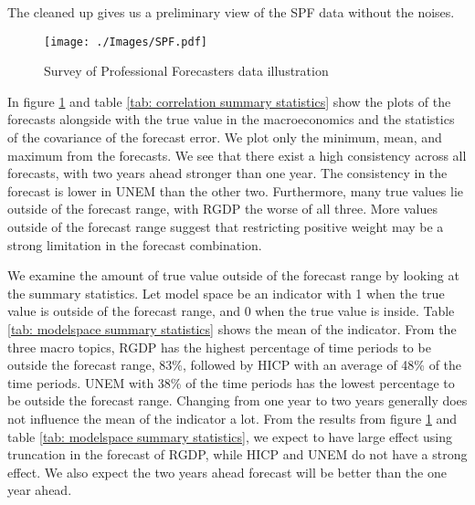 \documentclass[11pt]{article}
\begin{document}
The cleaned up gives us a preliminary view of the SPF data without the noises.

\begin{figure}[!h]
	\centering
	\texttt{[image: ./Images/SPF.pdf]}
	\caption{Survey of Professional Forecasters data illustration}\label{fig: SPF data illustration}
\end{figure}

In figure \ref{fig: SPF data illustration} and table \ref{tab: correlation summary statistics} show the plots of the forecasts alongside with the true value in the macroeconomics and the statistics of the covariance of the forecast error. We plot only the minimum, mean, and maximum from the forecasts. We see that there exist a high consistency across all forecasts, with two years ahead stronger than one year. The consistency in the forecast is lower in UNEM than the other two. Furthermore, many true values lie outside of the forecast range, with RGDP the worse of all three. More values outside of the forecast range suggest that restricting positive weight may be a strong limitation in the forecast combination.

We examine the amount of true value outside of the forecast range by looking at the summary statistics. Let model space be an indicator with 1 when the true value is outside of the forecast range, and 0 when the true value is inside. Table \ref{tab: modelspace summary statistics} shows the mean of the indicator. From the three macro topics, RGDP has the highest percentage of time periods to be outside the forecast range, 83\%, followed by HICP with an average of 48\% of the time periods. UNEM with 38\% of the time periods has the lowest percentage to be outside the forecast range. Changing from one year to two years generally does not influence the mean of the indicator a lot. From the results from figure \ref{fig: SPF data illustration} and table \ref{tab: modelspace summary statistics}, we expect to have large effect using truncation in the forecast of RGDP, while HICP and UNEM do not have a strong effect. We also expect the two years ahead forecast will be better than the one year ahead.
\end{document}
